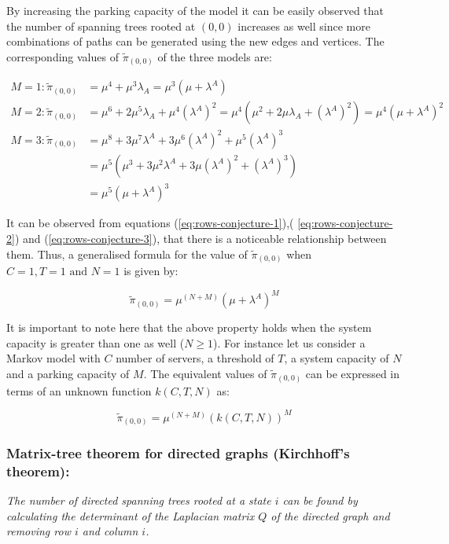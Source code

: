 By increasing the parking capacity of the model it can be easily observed that the number of spanning trees rooted at \((0,0)\) increases as well since more combinations of paths can be generated using the new edges and vertices. The corresponding values of \(\tilde{\pi}_{(0,0)}\) of the three models are:

\begin{align}
    M = 1: \tilde{\pi}_{(0,0)} &= \mu^4 + \mu^3 \lambda_A = \mu^3 (\mu + \lambda^A) \label{eq:rows-conjecture-1}\\
    M = 2: \tilde{\pi}_{(0,0)} &= \mu^6 + 2\mu^5 \lambda_A + \mu^4 (\lambda^A)^2 = \mu^4(\mu^2 + 2\mu \lambda_A + (\lambda^A)^2) = \mu^4 (\mu + \lambda^A) ^ 2 \label{eq:rows-conjecture-2}\\
    M = 3: \tilde{\pi}_{(0,0)} &= \mu^8 + 3 \mu^7 \lambda^A + 3 \mu^6 (\lambda^A)^2 + \mu^5(\lambda^A)^3 \nonumber \\
    &= \mu^5 (\mu^3 + 3 \mu ^2 \lambda^A + 3 \mu (\lambda^A)^2 + (\lambda^A)^3) \nonumber \\
    &= \mu^5 (\mu + \lambda^A) ^ 3 \label{eq:rows-conjecture-3}
\end{align}

It can be observed from equations (\ref{eq:rows-conjecture-1}),( \ref{eq:rows-conjecture-2}) and (\ref{eq:rows-conjecture-3}), that there is a noticeable relationship between them. Thus, a generalised formula for the value of \(\tilde{\pi}_{(0,0)}\) when \(C=1, T=1 \text{ and } N=1\) is given by:

\begin{equation}\label{eq:rows-conjecture-general}
    \tilde{\pi}_{(0,0)} = \mu^{(N+M)} (\mu + \lambda^A)^M
\end{equation}

It is important to note here that the above property holds when the system capacity is greater than one as well (\(N \geq 1\)). For instance let us consider a Markov model with \(C\) number of servers, a threshold of \(T\), a system capacity of \(N\) and a parking capacity of \(M\). The equivalent values of \(\tilde{\pi}_{(0,0)}\) can be expressed in terms of an unknown function \(k(C,T,N)\) as:

\begin{equation}
    \tilde{\pi}_{(0,0)} = \mu^{(N+M)} (k(C,T,N))^M
\end{equation}


\subsubsection{Matrix-tree theorem for directed graphs (Kirchhoff's theorem):}
\textit{The number of directed spanning trees rooted at a state \(i\) can be found by calculating the determinant of the Laplacian matrix \(Q\) of the directed graph and removing row \(i\) and column \(i\).}


